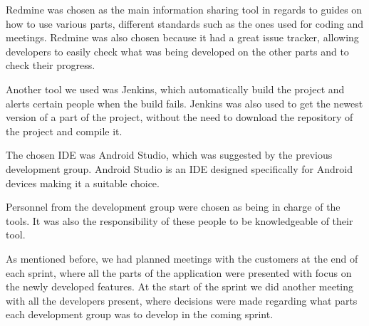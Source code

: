 Redmine was chosen as the main information sharing tool in regards to guides on how to use various parts, different standards such as the ones used for coding and meetings.
Redmine was also chosen because it had a great issue tracker, allowing developers to easily check what was being developed on the other parts and to check their progress.

Another tool we used was Jenkins, which automatically build the project and alerts certain people when the build fails.
Jenkins was also used to get the newest version of a part of the project, without the need to download the repository of the project and compile it.

The chosen IDE was Android Studio, which was suggested by the previous development group. Android Studio is an IDE designed specifically for Android devices making it a suitable choice.

Personnel from the development group were chosen as being in charge of the tools.
It was also the responsibility of these people to be knowledgeable of their tool.

As mentioned before, we had planned meetings with the customers at the end of each sprint, where all the parts of the application were presented with focus on the newly developed features.
At the start of the sprint we did another meeting with all the developers present, where decisions were made regarding what parts each development group was to develop in the coming sprint.

